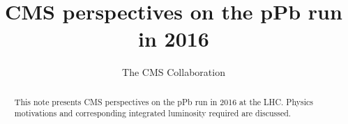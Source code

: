 \documentclass[12pt]{article}
\title{CMS perspectives on the pPb run in 2016}
\author
{ The CMS Collaboration }
\date{}
\begin{document}
 


\baselineskip24pt


\maketitle 


\begin{abstract}

This note presents CMS perspectives on the pPb run in 2016 at the LHC. 
Physics motivations and corresponding integrated luminosity required are discussed.



\end{abstract}


\clearpage



\clearpage



\clearpage

\clearpage





\clearpage
\end{document}
